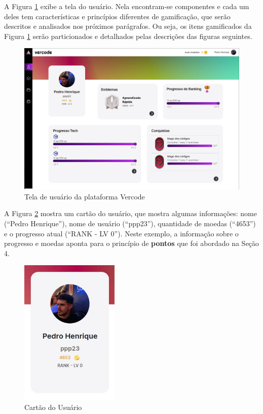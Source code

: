 \documentclass[12pt]{article}
\begin{document}
A Figura \ref{fig:tela_usuario} exibe a tela do usuário. Nela encontram-se componentes e cada um deles tem características e princípios diferentes de gamificação, que serão descritos e analisados nos próximos parágrafos. Ou seja, os itens gamificados da Figura \ref{fig:tela_usuario} serão  particionados e detalhados pelas descrições das figuras seguintes.  

\begin{figure}[ht!]
\centering
\includegraphics[width=1.0\textwidth]{imagens/tela_usuario.jpg}
\caption{Tela de usuário da plataforma Vercode}
\label{fig:tela_usuario}
\end{figure}

A Figura \ref{fig:cartao_usuario} mostra um cartão do usuário, que mostra algumas informações: nome (“Pedro Henrique”), nome de usuário (“ppp23”), quantidade de moedas (“4653”) e o progresso atual (“RANK - LV 0”). Neste exemplo, a informação sobre o progresso e moedas aponta para o princípio de \textbf{pontos} que foi abordado na Seção 4. 

\begin{figure}[ht!]
\centering
\includegraphics[width=0.42\textwidth]{imagens/cartao_usuario.jpg}
\caption{Cartão do Usuário}
\label{fig:cartao_usuario}
\end{figure}
\end{document}
